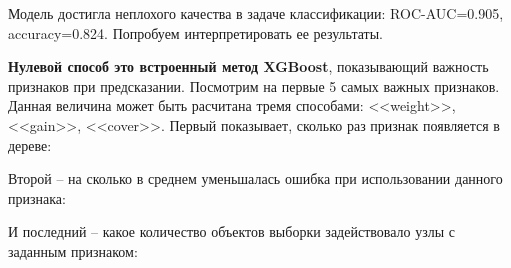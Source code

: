 Модель достигла неплохого качества в задаче классификации: ROC-AUC=0.905, accuracy=0.824. Попробуем интерпретировать ее результаты.

\textbf{Нулевой способ это встроенный метод XGBoost}, показывающий важность признаков при предсказании. Посмотрим на первые 5 самых важных признаков. Данная величина может быть расчитана тремя способами: <<weight>>, <<gain>>, <<cover>>. Первый показывает, сколько раз признак появляется в дереве:

\begin{figure}[h]
\end{figure}

Второй -- на сколько в среднем уменьшалась ошибка при использовании данного признака:

\begin{figure}[h]
\end{figure}

И последний -- какое количество объектов выборки задействовало узлы с заданным признаком:

\begin{figure}[h]
\end{figure}

